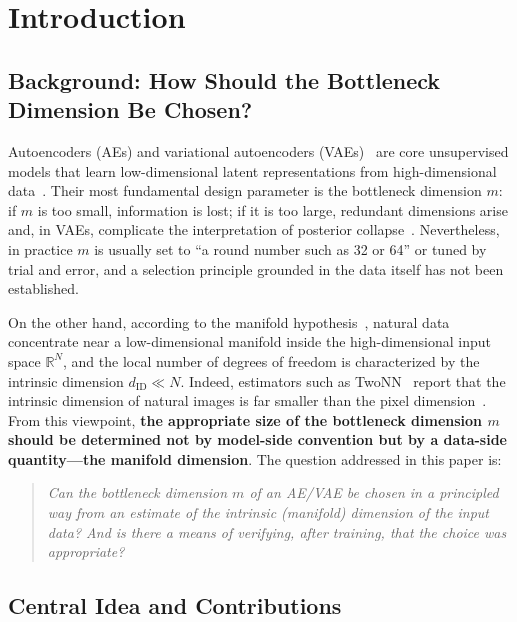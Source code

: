 \documentclass[make,article,submit,pdftex,moreauthors]{Definitions/mdpi}
\newcommand{\dID}{d_{\mathrm{ID}}}
\newcommand{\R}{\mathbb{R}}
\begin{document}
\section{Introduction}\label{sec:intro}

\subsection{Background: How Should the Bottleneck Dimension Be Chosen?}\label{sec:intro_bg}

Autoencoders (AEs) and variational autoencoders
(VAEs)~\cite{kingma2014vae} are core unsupervised models that learn
low-dimensional latent representations from high-dimensional
data~\cite{bengio2013representation}.
Their most fundamental design parameter is the bottleneck dimension $m$:
if $m$ is too small, information is lost; if it is too large, redundant
dimensions arise and, in VAEs, complicate the interpretation of posterior
collapse~\cite{lucas2019elbo}.
Nevertheless, in practice $m$ is usually set to ``a round number such as 32
or 64'' or tuned by trial and error, and a selection principle grounded in
the data itself has not been established.

On the other hand, according to the manifold
hypothesis~\cite{fefferman2016manifold}, natural data concentrate near a
low-dimensional manifold inside the high-dimensional input space $\R^N$,
and the local number of degrees of freedom is characterized by the intrinsic
dimension $\dID \ll N$.
Indeed, estimators such as TwoNN~\cite{facco2017twonn} report that the
intrinsic dimension of natural images is far smaller than the pixel
dimension~\cite{pope2021intrinsic}.
From this viewpoint, \textbf{the appropriate size of the bottleneck
dimension $m$ should be determined not by model-side convention but by a
data-side quantity---the manifold dimension}.
The question addressed in this paper is:
\begin{quote}
\textit{Can the bottleneck dimension $m$ of an AE/VAE be chosen in a
principled way from an estimate of the intrinsic (manifold) dimension of the
input data?
And is there a means of verifying, after training, that the choice was
appropriate?}
\end{quote}

\subsection{Central Idea and Contributions}\label{sec:intro_aim}
\end{document}
